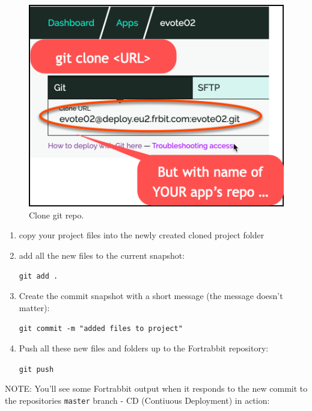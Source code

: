 \documentclass[a4paperpaper,openright]{book}
\begin{document}
\begin{figure}
\centering
\includegraphics{./tex2pdf.-5a4428120ede4be1/c51a23adeab67e7c05dc8b5e9068b31e59612313.png}
\caption{Clone git repo.\label{cloneLocal}}
\end{figure}

\begin{enumerate}
\def\labelenumi{\arabic{enumi}.}
\item
  copy your project files into the newly created cloned project folder
\item
  add all the new files to the current snapshot:

  \texttt{git\ add\ .}
\item
  Create the commit snapshot with a short message (the message doesn't
  matter):

  \texttt{git\ commit\ -m\ "added\ files\ to\ project"}
\item
  Push all these new files and folders up to the Fortrabbit repository:

  \texttt{git\ push}
\end{enumerate}

NOTE: You'll see some Fortrabbit output when it responds to the new
commit to the repositories \texttt{master} branch - CD (Contiuous
Deployment) in action:
\end{document}
